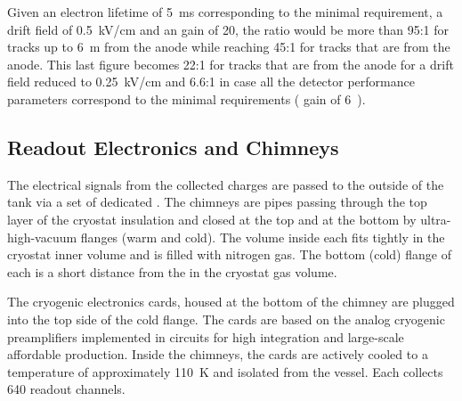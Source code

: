 Given an electron lifetime of \SI{5}{ms} corresponding to the minimal requirement,  a drift field of \SI{0.5}{kV/cm} and an  gain of \num{20}, the  ratio would be more than  \num{95}:\num{1} for tracks up to \SI{6}{m} from the anode while reaching  \num{45}:\num{1} for   tracks that are \dpmaxdrift from the anode. This last figure becomes  \num{22}:\num{1} for   tracks that are \dpmaxdrift from the anode for a drift field reduced to  \SI{0.25}{kV/cm} and \num{6.6}:\num{1} in case all the detector performance parameters correspond to the minimal requirements ( gain of  \SI{6}).



\begin{comment}
\begin{dunefigure}[\dshort{crp} for \dshort{pddp} undergoing the \coldbox test]{fig:dp-execsum-crp}
  {A  \dword{crp} built for \dword{pddp} undergoing the \coldbox test procedure.}
  \texttt{[image: cold\_box\_crp.png]}
\end{dunefigure}
\end{comment}


\subsection{Readout Electronics and Chimneys}
\label{sec:dp-execsum-electronics}

The electrical signals from the collected charges are passed to the outside of the tank via a set of dedicated . The chimneys are pipes passing through the top layer of the cryostat insulation and closed at the top and at the bottom by ultra-high-vacuum flanges (warm and cold). The volume inside each  fits tightly in the cryostat inner volume and is filled with nitrogen gas. The bottom (cold) flange of each  is a short distance  from the  in the cryostat gas volume.

The cryogenic  electronics cards, housed at the bottom of the chimney are plugged into the top side of  the cold flange. The  cards are based on the analog cryogenic preamplifiers implemented in   circuits for high integration and large-scale affordable production. 
Inside the chimneys, the cards are actively cooled to a temperature of approximately \SI{110}{K} and isolated from the  vessel. %
Each  collects \num{640} readout channels. 

